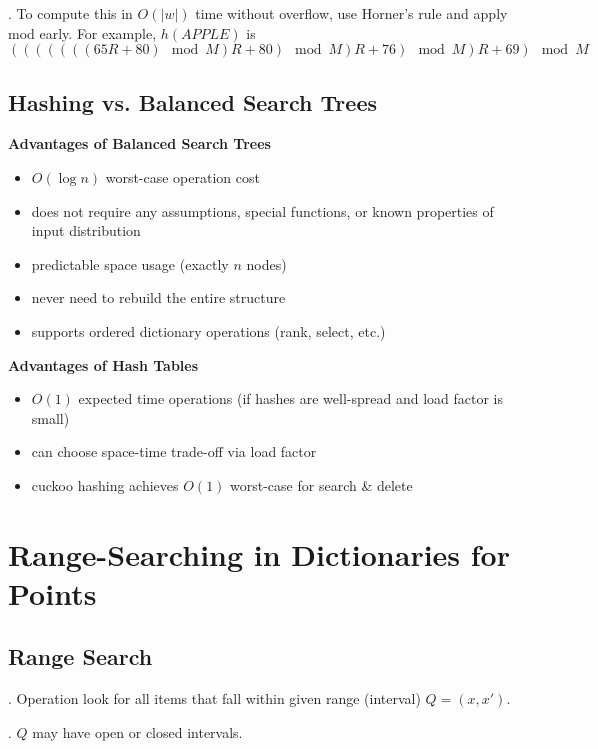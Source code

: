 \documentclass{article}
\begin{document}
\begin{codes}[].
    To compute this in $O(|w|)$ time without overflow, use Horner’s rule and apply mod early. For example, $h(\mathit{APPLE})$ is
    \[ \left( \left( \left( \left( \left( \left( (65R + 80) \mod M \right) R + 80 \right) \mod M \right) R + 76 \right) \mod M \right) R + 69 \right) \mod M \]
\end{codes}

\subsection{Hashing vs. Balanced Search Trees}

\textbf{Advantages of Balanced Search Trees}
\begin{itemize}
    \item $O(\log n)$ worst-case operation cost
    \item does not require any assumptions, special functions, or known properties of input distribution
    \item predictable space usage (exactly $n$ nodes)
    \item never need to rebuild the entire structure
    \item supports ordered dictionary operations (rank, select, etc.)
\end{itemize}
\textbf{Advantages of Hash Tables}
\begin{itemize}
    \item $O(1)$ expected time operations (if hashes are well-spread and load factor is small)
    \item can choose space-time trade-off via load factor
    \item cuckoo hashing achieves $O(1)$ worst-case for search \& delete
\end{itemize}


\newpage

\section{Range-Searching in Dictionaries for Points} 

\subsection{Range Search}

\begin{deff}.
    Operation  look for all items that fall within given range (interval) $Q = (x, x')$. 
    \begin{comm}[].
        $Q$ may have open or closed intervals. 
    \end{comm}
\end{deff}
\end{document}
